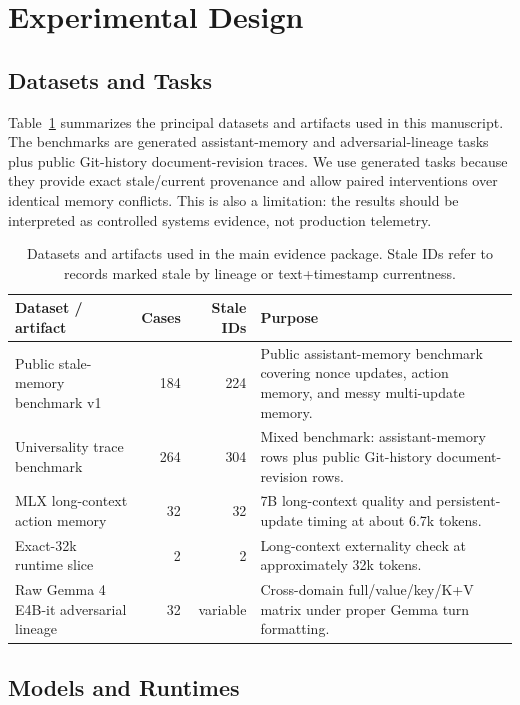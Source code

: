 \documentclass[11pt]{article}
\newcommand{\gemma}{Gemma 4 E4B-it}
\begin{document}
\section{Experimental Design}

\subsection{Datasets and Tasks}

Table~\ref{tab:datasets} summarizes the principal datasets and artifacts used
in this manuscript. The benchmarks are generated assistant-memory and
adversarial-lineage tasks plus public Git-history document-revision traces. We
use generated tasks because they provide exact stale/current provenance and
allow paired interventions over identical memory conflicts. This is also a
limitation: the results should be interpreted as controlled systems evidence,
not production telemetry.

\begin{table}[H]
\centering
\small
\begin{tabularx}{\linewidth}{lrrX}
\toprule
\textbf{Dataset / artifact} & \textbf{Cases} & \textbf{Stale IDs} & \textbf{Purpose} \\
\midrule
Public stale-memory benchmark v1 & 184 & 224 & Public assistant-memory benchmark covering nonce updates, action memory, and messy multi-update memory. \\
Universality trace benchmark & 264 & 304 & Mixed benchmark: assistant-memory rows plus public Git-history document-revision rows. \\
MLX long-context action memory & 32 & 32 & 7B long-context quality and persistent-update timing at about 6.7k tokens. \\
Exact-32k runtime slice & 2 & 2 & Long-context externality check at approximately 32k tokens. \\
Raw \gemma{} adversarial lineage & 32 & variable & Cross-domain full/value/key/K+V matrix under proper Gemma turn formatting. \\
\bottomrule
\end{tabularx}
\caption{Datasets and artifacts used in the main evidence package. Stale IDs
refer to records marked stale by lineage or text+timestamp currentness.}
\label{tab:datasets}
\end{table}

\subsection{Models and Runtimes}
\end{document}
